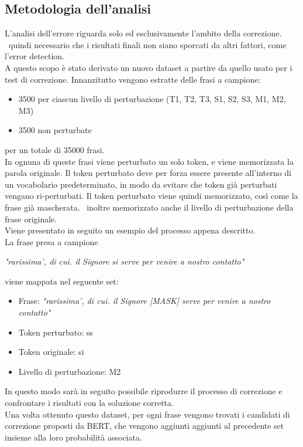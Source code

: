\documentclass[12pt]{article}
\begin{document}
\subsection{Metodologia dell'analisi}
L'analisi dell'errore riguarda solo ed esclusivamente l'ambito della correzione. \E\ quindi necessario che i risultati finali non siano sporcati da altri fattori, come l'error detection.\\
A questo scopo è stato derivato un nuovo dataset a partire da quello usato per i test di correzione. Innanzitutto vengono estratte delle frasi a campione:
\begin{itemize}
\item 3500 per ciascun livello di perturbazione (T1, T2, T3, S1, S2, S3, M1, M2, M3)
\item 3500 non perturbate
\end{itemize}
per un totale di 35000 frasi.\\
In ognuna di queste frasi viene perturbato un solo token, e viene memorizzata la parola originale. Il token perturbato deve per forza essere presente all'interno di un vocabolario predeterminato, in modo da evitare che token già perturbati vengano ri-perturbati. Il token perturbato viene quindi memorizzato, così come la frase già mascherata. \E\ inoltre memorizzato anche il livello di perturbazione della frase originale.\\
Viene presentato in seguito un esempio del processo appena descritto.\\
La frase presa a campione
\begin{center}
\textit{"rarissima', di cui. il Signore si serve per venire a nostro contatto"}
\end{center}
viene mappata nel seguente set:

\begin{itemize}
\item Frase: \textit{"rarissima', di cui. il Signore [MASK] serve per venire a nostro contatto"} 
\item Token perturbato: ss
\item Token originale: si
\item Livello di perturbazione: M2
\end{itemize}

In questo modo sarà in seguito possibile riprodurre il processo di correzione e confrontare i risultati con la soluzione corretta.\\
Una volta ottenuto questo dataset, per ogni frase vengono trovati i candidati di correzione proposti da BERT, che vengono aggiunti aggiunti al precedente set insieme alla loro probabilità associata.
\end{document}
